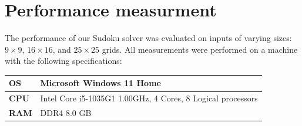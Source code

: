 \documentclass[paper=a4, fontsize=12pt]{scrartcl}
\numberwithin{equation}{section}
\numberwithin{figure}{section}
\numberwithin{table}{section}
\begin{document}
    \section{Performance measurment}
    The performance of our Sudoku solver was evaluated on inputs of varying sizes: $9\times 9$, $16\times 16$, and $25\times 25$ grids. 
    All measurements were performed on a machine with the following specifications: 
    \begin{table}[!ht]
        \centering
        \begin{tabular}{|l|l|}
        \hline
        \textbf{OS}  & Microsoft Windows 11 Home                                                \\ \hline
        \textbf{CPU} & Intel Core i5-1035G1 1.00GHz, 4 Cores, 8  Logical processors \\ \hline
        \textbf{RAM} & DDR4 8.0 GB                                                               \\ \hline
        \end{tabular}
    \end{table}
\end{document}
